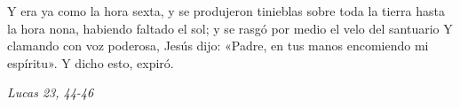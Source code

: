 \documentclass[../../devocionario.tex]{subfiles}
\begin{document}
    Y era ya como la hora sexta, y se produjeron tinieblas sobre toda la tierra hasta la hora nona, 
    habiendo faltado el sol; y se rasgó por medio el velo del santuario Y clamando con voz poderosa, 
    Jesús dijo: «Padre, en tus manos encomiendo mi espíritu». Y dicho esto, expiró.

    \begin{flushright}
        \textit{Lucas 23, 44-46}
    \end{flushright}
\end{document}
